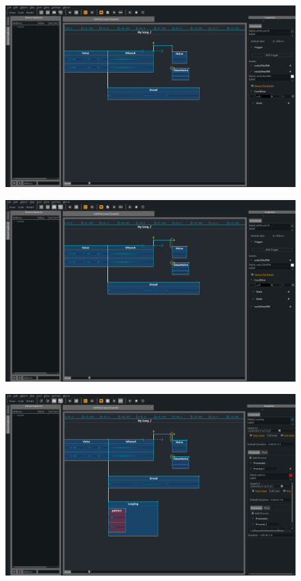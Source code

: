 \documentclass[draft]{beamer}
\begin{document}
\begin{frame} 
    \Large
    \begin{figure}
        \centering
        \includegraphics[width=\textwidth]{images/screens/7.png}
    \end{figure}
\end{frame}
\begin{frame} 
    \Large
    \begin{figure}
        \centering
        \includegraphics[width=\textwidth]{images/screens/8.png}
    \end{figure}
\end{frame}
\begin{frame} 
    \Large
    \begin{figure}
        \centering
        \includegraphics[width=\textwidth]{images/screens/9.png}
    \end{figure}
\end{frame}
\end{document}
